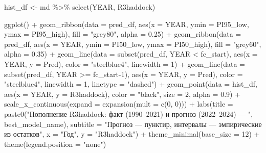 \documentclass[
  letterpaper,
  DIV=11,
  numbers=noendperiod]{scrreprt}
\newenvironment{Shaded}{\begin{snugshade}}{\end{snugshade}}
\newcommand{\AttributeTok}[1]{\textcolor[rgb]{0.40,0.45,0.13}{#1}}
\newcommand{\DecValTok}[1]{\textcolor[rgb]{0.68,0.00,0.00}{#1}}
\newcommand{\FloatTok}[1]{\textcolor[rgb]{0.68,0.00,0.00}{#1}}
\newcommand{\FunctionTok}[1]{\textcolor[rgb]{0.28,0.35,0.67}{#1}}
\newcommand{\NormalTok}[1]{\textcolor[rgb]{0.00,0.23,0.31}{#1}}
\newcommand{\OtherTok}[1]{\textcolor[rgb]{0.00,0.23,0.31}{#1}}
\newcommand{\SpecialCharTok}[1]{\textcolor[rgb]{0.37,0.37,0.37}{#1}}
\newcommand{\StringTok}[1]{\textcolor[rgb]{0.13,0.47,0.30}{#1}}
\begin{document}
\begin{Shaded}
\begin{Highlighting}[]
\NormalTok{hist\_df }\OtherTok{\textless{}{-}}\NormalTok{ md }\SpecialCharTok{\%\textgreater{}\%} \FunctionTok{select}\NormalTok{(YEAR, R3haddock)}

\FunctionTok{ggplot}\NormalTok{() }\SpecialCharTok{+}
  \FunctionTok{geom\_ribbon}\NormalTok{(}\AttributeTok{data =}\NormalTok{ pred\_df, }\FunctionTok{aes}\NormalTok{(}\AttributeTok{x =}\NormalTok{ YEAR, }\AttributeTok{ymin =}\NormalTok{ PI95\_low, }\AttributeTok{ymax =}\NormalTok{ PI95\_high), }\AttributeTok{fill =} \StringTok{"grey80"}\NormalTok{, }\AttributeTok{alpha =} \FloatTok{0.25}\NormalTok{) }\SpecialCharTok{+}
  \FunctionTok{geom\_ribbon}\NormalTok{(}\AttributeTok{data =}\NormalTok{ pred\_df, }\FunctionTok{aes}\NormalTok{(}\AttributeTok{x =}\NormalTok{ YEAR, }\AttributeTok{ymin =}\NormalTok{ PI50\_low, }\AttributeTok{ymax =}\NormalTok{ PI50\_high), }\AttributeTok{fill =} \StringTok{"grey60"}\NormalTok{, }\AttributeTok{alpha =} \FloatTok{0.35}\NormalTok{) }\SpecialCharTok{+}
  \FunctionTok{geom\_line}\NormalTok{(}\AttributeTok{data =} \FunctionTok{subset}\NormalTok{(pred\_df, YEAR }\SpecialCharTok{\textless{}}\NormalTok{ fc\_start), }\FunctionTok{aes}\NormalTok{(}\AttributeTok{x =}\NormalTok{ YEAR, }\AttributeTok{y =}\NormalTok{ Pred), }\AttributeTok{color =} \StringTok{"steelblue4"}\NormalTok{, }\AttributeTok{linewidth =} \DecValTok{1}\NormalTok{) }\SpecialCharTok{+}
  \FunctionTok{geom\_line}\NormalTok{(}\AttributeTok{data =} \FunctionTok{subset}\NormalTok{(pred\_df, YEAR }\SpecialCharTok{\textgreater{}=}\NormalTok{ fc\_start}\DecValTok{{-}1}\NormalTok{), }\FunctionTok{aes}\NormalTok{(}\AttributeTok{x =}\NormalTok{ YEAR, }\AttributeTok{y =}\NormalTok{ Pred), }\AttributeTok{color =} \StringTok{"steelblue4"}\NormalTok{, }\AttributeTok{linewidth =} \DecValTok{1}\NormalTok{, }\AttributeTok{linetype =} \StringTok{"dashed"}\NormalTok{) }\SpecialCharTok{+}
  \FunctionTok{geom\_point}\NormalTok{(}\AttributeTok{data =}\NormalTok{ hist\_df, }\FunctionTok{aes}\NormalTok{(}\AttributeTok{x =}\NormalTok{ YEAR, }\AttributeTok{y =}\NormalTok{ R3haddock), }\AttributeTok{color =} \StringTok{"black"}\NormalTok{, }\AttributeTok{size =} \DecValTok{2}\NormalTok{, }\AttributeTok{alpha =} \FloatTok{0.9}\NormalTok{) }\SpecialCharTok{+}
  \FunctionTok{scale\_x\_continuous}\NormalTok{(}\AttributeTok{expand =} \FunctionTok{expansion}\NormalTok{(}\AttributeTok{mult =} \FunctionTok{c}\NormalTok{(}\DecValTok{0}\NormalTok{, }\DecValTok{0}\NormalTok{))) }\SpecialCharTok{+}
  \FunctionTok{labs}\NormalTok{(}\AttributeTok{title =} \FunctionTok{paste0}\NormalTok{(}\StringTok{"Пополнение R3haddock: факт (1990–2021) и прогноз (2022–2024) — "}\NormalTok{, best\_model\_name),}
       \AttributeTok{subtitle =} \StringTok{"Прогноз — пунктир, интервалы — эмпирические из остатков"}\NormalTok{,}
       \AttributeTok{x =} \StringTok{"Год"}\NormalTok{, }\AttributeTok{y =} \StringTok{"R3haddock"}\NormalTok{) }\SpecialCharTok{+}
  \FunctionTok{theme\_minimal}\NormalTok{(}\AttributeTok{base\_size =} \DecValTok{12}\NormalTok{) }\SpecialCharTok{+}
  \FunctionTok{theme}\NormalTok{(}\AttributeTok{legend.position =} \StringTok{"none"}\NormalTok{)}


\end{Highlighting}
\end{Shaded}
\end{document}
